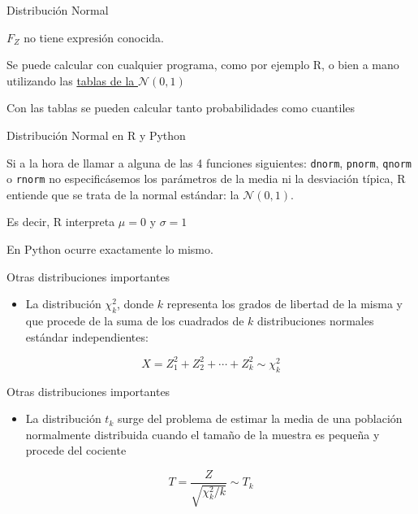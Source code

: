 \documentclass[
  ignorenonframetext,
]{beamer}
\providecommand{\tightlist}{%
  \setlength{\itemsep}{0pt}\setlength{\parskip}{0pt}}
\begin{document}
\begin{frame}{Distribución Normal}
\protect\hypertarget{distribuciuxf3n-normal-5}{}

\(F_Z\) no tiene expresión conocida.

Se puede calcular con cualquier programa, como por ejemplo R, o bien a
mano utilizando las
\href{https://github.com/joanby/r-basic/blob/master/teoria/TablaNormal.pdf}{tablas
de la \(\mathcal{N}(0,1)\)}

Con las tablas se pueden calcular tanto probabilidades como cuantiles

\end{frame}

\begin{frame}[fragile]{Distribución Normal en R y Python}
\protect\hypertarget{distribuciuxf3n-normal-en-r-y-python}{}

Si a la hora de llamar a alguna de las 4 funciones siguientes:
\texttt{dnorm}, \texttt{pnorm}, \texttt{qnorm} o \texttt{rnorm} no
especificásemos los parámetros de la media ni la desviación típica, R
entiende que se trata de la normal estándar: la \(\mathcal{N}(0,1)\).

Es decir, R interpreta \(\mu = 0\) y \(\sigma = 1\)

En Python ocurre exactamente lo mismo.

\end{frame}

\begin{frame}{Otras distribuciones importantes}
\protect\hypertarget{otras-distribuciones-importantes}{}

\begin{itemize}
\tightlist
\item
  La distribución \(\chi^2_k\), donde \(k\) representa los grados de
  libertad de la misma y que procede de la suma de los cuadrados de
  \(k\) distribuciones normales estándar independientes:
\end{itemize}

\[X = Z_1^2 + Z_2^2+\cdots + Z_k^2\sim \chi_k^2\]

\end{frame}

\begin{frame}{Otras distribuciones importantes}
\protect\hypertarget{otras-distribuciones-importantes-1}{}

\begin{itemize}
\tightlist
\item
  La distribución \(t_k\) surge del problema de estimar la media de una
  población normalmente distribuida cuando el tamaño de la muestra es
  pequeña y procede del cociente
\end{itemize}

\[T = \frac{Z}{\sqrt{\chi^2_k/k}}\sim T_k\]

\end{frame}
\end{document}
